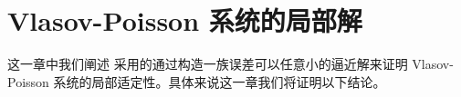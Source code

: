 
\newcommand{\rhoabs}{\hyperref[eq:rhoabs-control]{$\rho_{abs}$ 控制条件}}
\newcommand{\supremumf}{\hyperref[eq:supremum-f0-control]{$\sup f_{0}$ 控制条件}}
\newcommand{\lipxOfrho}{\hyperref[eq:lipx_rho_control]{$\operatorname{lip}_x(\rho)$ 控制条件}}
\newcommand{\lipOffVsphere}{\hyperref[eq:lip_Of_f0_in_vsphere_control]{$v$ 球内 $\operatorname{lip}(f_0)$ 控制条件}}
\newcommand{\boundcondition}{\hyperref[de:boundness]{有界条件}}



\chapter{Vlasov-Poisson 系统的局部解}

这一章中我们阐述 \cite*{HorstClasssicalI} 采用的通过构造一族误差可以任意小的逼近解来证明 Vlasov-Poisson 系统的局部适定性。具体来说这一章我们将证明以下结论。



